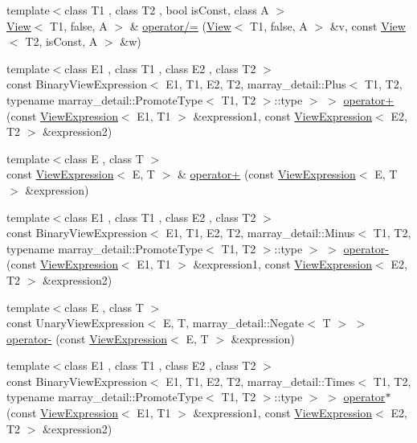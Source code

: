 \begin{DoxyCompactItemize}
\item 
{\footnotesize template$<$class T1 , class T2 , bool is\+Const, class A $>$ }\\\hyperlink{classandres_1_1View}{View}$<$ T1, false, A $>$ \& \hyperlink{namespaceandres_af7defe3aacf03796d2490277f8446aa7}{operator/=} (\hyperlink{classandres_1_1View}{View}$<$ T1, false, A $>$ \&v, const \hyperlink{classandres_1_1View}{View}$<$ T2, is\+Const, A $>$ \&w)
\item 
{\footnotesize template$<$class E1 , class T1 , class E2 , class T2 $>$ }\\const Binary\+View\+Expression$<$ E1, T1, E2, T2, marray\+\_\+detail\+::\+Plus$<$ T1, T2, typename marray\+\_\+detail\+::\+Promote\+Type$<$ T1, T2 $>$\+::type $>$ $>$ \hyperlink{namespaceandres_a43eb4a16a1f776bc81a7f58fa93a0c71}{operator+} (const \hyperlink{classandres_1_1ViewExpression}{View\+Expression}$<$ E1, T1 $>$ \&expression1, const \hyperlink{classandres_1_1ViewExpression}{View\+Expression}$<$ E2, T2 $>$ \&expression2)
\item 
{\footnotesize template$<$class E , class T $>$ }\\const \hyperlink{classandres_1_1ViewExpression}{View\+Expression}$<$ E, T $>$ \& \hyperlink{namespaceandres_af0a5caf93e8476b870c5f3ec31d0174d}{operator+} (const \hyperlink{classandres_1_1ViewExpression}{View\+Expression}$<$ E, T $>$ \&expression)
\item 
{\footnotesize template$<$class E1 , class T1 , class E2 , class T2 $>$ }\\const Binary\+View\+Expression$<$ E1, T1, E2, T2, marray\+\_\+detail\+::\+Minus$<$ T1, T2, typename marray\+\_\+detail\+::\+Promote\+Type$<$ T1, T2 $>$\+::type $>$ $>$ \hyperlink{namespaceandres_a30eb13a41805ae01b38c7ebf35179743}{operator-\/} (const \hyperlink{classandres_1_1ViewExpression}{View\+Expression}$<$ E1, T1 $>$ \&expression1, const \hyperlink{classandres_1_1ViewExpression}{View\+Expression}$<$ E2, T2 $>$ \&expression2)
\item 
{\footnotesize template$<$class E , class T $>$ }\\const Unary\+View\+Expression$<$ E, T, marray\+\_\+detail\+::\+Negate$<$ T $>$ $>$ \hyperlink{namespaceandres_a35120fff610c97905d02a9e358b14150}{operator-\/} (const \hyperlink{classandres_1_1ViewExpression}{View\+Expression}$<$ E, T $>$ \&expression)
\item 
{\footnotesize template$<$class E1 , class T1 , class E2 , class T2 $>$ }\\const Binary\+View\+Expression$<$ E1, T1, E2, T2, marray\+\_\+detail\+::\+Times$<$ T1, T2, typename marray\+\_\+detail\+::\+Promote\+Type$<$ T1, T2 $>$\+::type $>$ $>$ \hyperlink{namespaceandres_a37613f54e69908e108526ff99ad8b4ab}{operator$\ast$} (const \hyperlink{classandres_1_1ViewExpression}{View\+Expression}$<$ E1, T1 $>$ \&expression1, const \hyperlink{classandres_1_1ViewExpression}{View\+Expression}$<$ E2, T2 $>$ \&expression2)

\end{DoxyCompactItemize}

